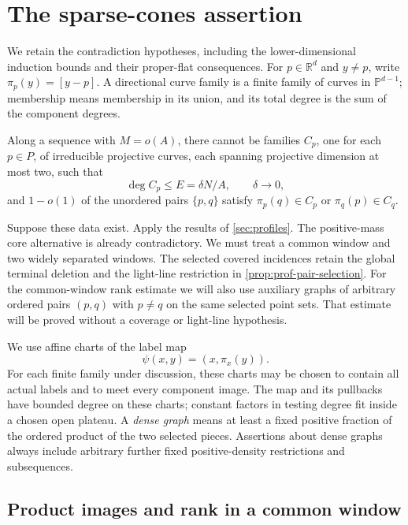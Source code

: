 \section{The sparse-cones assertion}\label{sec:sparse-cones}

We retain the contradiction hypotheses, including the lower-dimensional induction bounds and their proper-flat consequences.  For $p\in\mathbb{R}^d$ and $y\ne p$, write $\pi_p(y)=[y-p]$. A directional curve family is a finite family of curves in $\mathbb{P}^{d-1}$; membership means membership in its union, and its total degree is the sum of the component degrees.

\begin{theorem}\label{thm:sc-theorem}
Along a sequence with $M=o(A)$, there cannot be families $C_p$, one for each $p\in P$, of irreducible projective curves, each spanning projective dimension at most two, such that
\[
 \deg C_p\le E=\delta N/A,\qquad \delta\to0,
\]
and $1-o(1)$ of the unordered pairs $\{p,q\}$ satisfy $\pi_p(q)\in C_p$ or $\pi_q(p)\in C_q$.
\end{theorem}

Suppose these data exist. Apply the results of \cref{sec:profiles}. The positive-mass core alternative is already contradictory. We must treat a common window and two widely separated windows. The selected covered incidences retain the global terminal deletion and the light-line restriction in \cref{prop:prof-pair-selection}. For the common-window rank estimate we will also use auxiliary graphs of arbitrary ordered pairs $(p,q)$ with $p\ne q$ on the same selected point sets. That estimate will be proved without a coverage or light-line hypothesis.

We use affine charts of the label map
\begin{equation}\label{eq:sc-label-map}
 \psi(x,y)=(x,\pi_x(y)).
\end{equation}
For each finite family under discussion, these charts may be chosen to contain all actual labels and to meet every component image. The map and its pullbacks have bounded degree on these charts; constant factors in testing degree fit inside a chosen open plateau.  A \emph{dense graph} means at least a fixed positive fraction of the ordered product of the two selected pieces. Assertions about dense graphs always include arbitrary further fixed positive-density restrictions and subsequences.

\subsection{Product images and rank in a common window}

